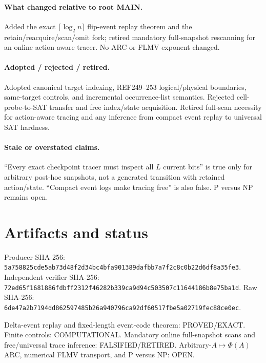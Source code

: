 \documentclass[11pt]{article}
\newcommand{\status}[1]{\textsf{#1}}
\begin{document}
\paragraph{What changed relative to root MAIN.}
Added the exact $\lceil\log_2n\rceil$ flip-event replay theorem and the retain/reacquire/scan/omit fork; retired mandatory full-snapshot rescanning for an online action-aware tracer.  No ARC or FLMV exponent changed.

\paragraph{Adopted / rejected / retired.}
Adopted canonical target indexing, REF249--253 logical/physical boundaries, same-target controls, and incremental occurrence-list semantics.  Rejected cell-probe-to-SAT transfer and free index/state acquisition.  Retired full-scan necessity for action-aware tracing and any inference from compact event replay to universal SAT hardness.

\paragraph{Stale or overstated claims.}
``Every exact checkpoint tracer must inspect all $L$ current bits'' is true only for arbitrary post-hoc snapshots, not a generated transition with retained action/state.  ``Compact event logs make tracing free'' is also false.  P versus NP remains open.

\section{Artifacts and status}
Producer SHA-256: \texttt{5a758825cde5ab73d48f2d34bc4bfa901389dafbb7a7f2c8c0b22d6df8a35fe3}.  Independent verifier SHA-256: \texttt{72ed65f1681886fdbff2312f46282b339ca9d94c503507c11644186b8e75ba1d}.  Raw SHA-256: \texttt{6de47a2b7194dd862597485b26a940796ca92df60517fbe5a02719fec88ce0ec}.

Delta-event replay and fixed-length event-code theorem: \status{PROVED/EXACT}.  Finite controls: \status{COMPUTATIONAL}.  Mandatory online full-snapshot scans and free/universal trace inference: \status{FALSIFIED/RETIRED}.  Arbitrary-$A\mapsto\Phi(A)$ ARC, numerical FLMV transport, and P versus NP: \status{OPEN}.

\end{document}
